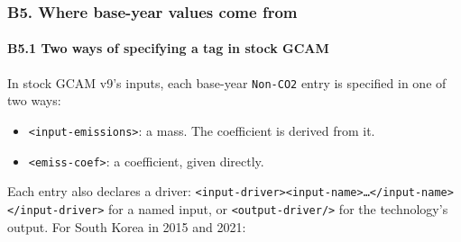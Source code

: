 \hypertarget{b5.-where-base-year-values-come-from}{%
\subsubsection{B5.
Where
base-year
values
come
from}\label{b5.-where-base-year-values-come-from}}

\hypertarget{b5.1-two-ways-of-specifying-a-tag-in-stock-gcam}{%
\paragraph{B5.1
Two ways
of
specifying
a tag in
stock
GCAM}\label{b5.1-two-ways-of-specifying-a-tag-in-stock-gcam}}

In stock
GCAM v9's
inputs,
each
base-year
\texttt{Non-\allowbreak{}CO2}
entry is
specified
in one of
two ways:

\begin{itemize}
\tightlist
\item
  \texttt{\textless{}input-\allowbreak{}emissions\textgreater{}}:
  a mass.
  The
  coefficient
  is
  derived
  from it.
\item
  \texttt{\textless{}emiss-\allowbreak{}coef\textgreater{}}:
  a
  coefficient,
  given
  directly.
\end{itemize}

Each entry
also
declares a
driver:
\texttt{\textless{}input-\allowbreak{}driver\textgreater{}\textless{}input-\allowbreak{}name\textgreater{}…\textless{}/\allowbreak{}input-\allowbreak{}name\textgreater{}\textless{}/\allowbreak{}input-\allowbreak{}driver\textgreater{}}
for a
named
input, or
\texttt{\textless{}output-\allowbreak{}driver/\allowbreak{}\textgreater{}}
for the
technology's
output.
For South
Korea in
2015 and
2021:


